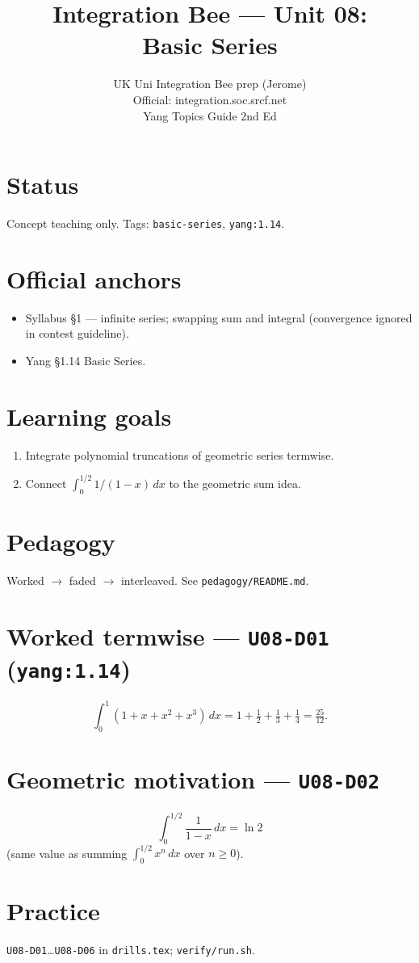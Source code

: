
\title{Integration Bee --- Unit 08:\\ Basic Series}
\author{UK Uni Integration Bee prep (Jerome)\\ Official: integration.soc.srcf.net\\ Yang Topics Guide 2nd Ed}
\date{}

\maketitle
\section*{Status}
Concept teaching only. Tags: \texttt{basic-series}, \texttt{yang:1.14}.
\section{Official anchors}
\begin{itemize}
  \item Syllabus §1 --- infinite series; swapping sum and integral (convergence ignored in contest guideline).
  \item Yang §1.14 Basic Series.
\end{itemize}
\section{Learning goals}
\begin{enumerate}
  \item Integrate polynomial truncations of geometric series termwise.
  \item Connect $\int_0^{1/2}1/(1-x)\,dx$ to the geometric sum idea.
\end{enumerate}
\section{Pedagogy}
Worked $\to$ faded $\to$ interleaved. See \texttt{pedagogy/README.md}.

\section{Worked termwise --- \texttt{U08-D01} (\texttt{yang:1.14})}
\[
\int_0^1(1+x+x^2+x^3)\,dx = 1+\tfrac12+\tfrac13+\tfrac14=\tfrac{25}{12}.
\]

\section{Geometric motivation --- \texttt{U08-D02}}
\[
\int_0^{1/2}\frac{1}{1-x}\,dx=\ln 2
\]
(same value as summing $\int_0^{1/2}x^n\,dx$ over $n\ge0$).

\section{Practice}
\texttt{U08-D01}\ldots\texttt{U08-D06} in \texttt{drills.tex}; \texttt{verify/run.sh}.

